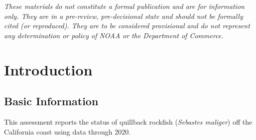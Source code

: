 \documentclass[11pt,
  english,
  a4paper,
]{article}
\begin{document}
\newcommand{\lt}{\ensuremath <}
\newcommand{\gt}{\ensuremath >}


\vspace{20cm}


\emph{These materials do not constitute a formal publication and are for information only. They are in a pre-review, pre-decisional state and should not be formally cited (or reproduced). They are to be considered provisional and do not represent any determination or policy of NOAA or the Department of Commerce.}

\leavevmode\tagmcend\tagstructend\par

\pagebreak
{}
\setcounter{page}{1}

\renewcommand{\thetable}{\roman{table}}
\renewcommand{\thefigure}{\roman{figure}}

\setlength\parskip{0.5em plus 0.1em minus 0.2em}

\pagebreak
\setlength{\parskip}{5mm plus1mm minus1mm}
\setcounter{page}{1}
\renewcommand{\thefigure}{\arabic{figure}}
\renewcommand{\thetable}{\arabic{table}}
\setcounter{table}{0}
\setcounter{figure}{0}


\hypertarget{introduction}{%
\section{Introduction}\label{introduction}}

\leavevmode\tagmcend\tagstructend


\hypertarget{basic-information}{%
\subsection{Basic Information}\label{basic-information}}

\leavevmode\tagmcend\tagstructend


This assessment reports the status of quillback rockfish (\emph{Sebastes maliger}) off the California coast using data through 2020.
\end{document}
